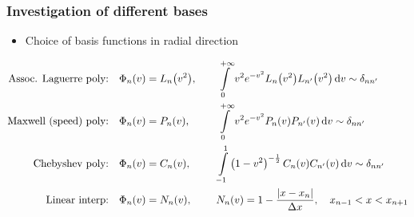 \documentclass[mathserif, aspectratio=169]{beamer}
\newcommand{\ud}{\,\mathrm{d}}
\newcommand{\of}[1]{\mleft( #1 \mright)}
\newcommand{\myint}[2]{\int\limits_{#1}^{#2}}
\begin{document}
\begin{frame}
\frametitle{Investigation of different bases}
%
\begin{itemize}
\item Choice of basis functions in radial direction
\end{itemize}
\small
\begin{align*}
\textrm{Assoc. Laguerre poly:}
& \quad \Phi_n\of{v} = L_n\of{v^2}, &&
\quad 
\myint{0}{+\infty} v^2 e^{-v^2} L_n\of{v^2} L_{n^\prime}\of{v^2} \ud v \sim \delta_{nn^\prime}
\\
\textrm{Maxwell (speed) poly:}
& \quad \Phi_n\of{v} = P_n\of{v}, &&
\quad 
\myint{0}{+\infty} v^2 e^{-v^2} P_n\of{v} P_{n^\prime}\of{v} \ud v \sim \delta_{nn^\prime}
\\
\textrm{Chebyshev poly:}
& \quad \Phi_n\of{v} = C_n\of{v}, &&
\quad 
\myint{-1}{1} \left(1-v^2\right)^{-\frac12} C_n\of{v} C_{n^\prime}\of{v} \ud v \sim \delta_{nn^\prime}
\\
\textrm{Linear interp:}
& \quad \Phi_n\of{v} = N_n\of{v}, &&
\quad 
N_n\of{v} = 1 - \frac{|x-x_n|}{\Delta x},\quad x_{n-1} < x < x_{n+1}
\end{align*}

%
\end{frame}
\end{document}
